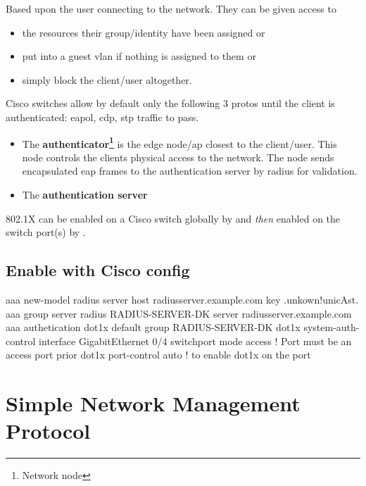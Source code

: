 
Based upon the user connecting to the network. They can be given access to
\begin{itemize}
	\item the resources their group/identity have been assigned or
	\item put into a guest \gls{vlan} if nothing is assigned to them or
	\item simply block the client/user altogether.
\end{itemize}

Cisco switches allow by default only the following 3 protos until the client is authenticated: \gls{eapol}, \gls{cdp}, \gls{stp} traffic to pass.

\begin{itemize}
	\item The \textbf{authenticator\footnote{Network node}} is the edge node/\gls{ap} closest to the client/user. This node controls the clients physical access to the network. The node sends encapsulated \gls{eap} frames to the authentication server by radius for validation.
	\item The \textbf{authentication server}
\end{itemize}


802.1X can be enabled on a Cisco switch globally by  and \textit{then} enabled on the switch port{\footnotesize (s)} by .

\clearpage

\subsection*{Enable with Cisco config}

\begin{txt}
	aaa new-model
	radius server host radiusserver.example.com key .unkown!unicAst.
	aaa group server radius RADIUS-SERVER-DK
	server radiusserver.example.com
	aaa authetication dot1x default group RADIUS-SERVER-DK
	dot1x system-auth-control
	interface GigabitEthernet 0/4
	switchport mode access         ! Port must be an access port prior
	dot1x port-control auto        ! to enable dot1x on the port
\end{txt}

\section[SNMP]{Simple Network Management Protocol}


